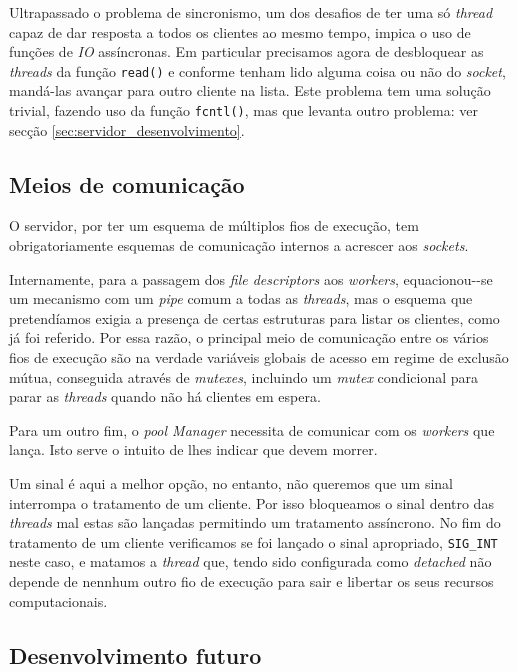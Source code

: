 	Ultrapassado o problema de sincronismo, um dos desafios de ter uma só \emph{thread} capaz de dar resposta a todos os clientes ao mesmo tempo, impica o uso de funções de \emph{IO} assíncronas.
	Em particular precisamos agora de desbloquear as \emph{threads} da função \verb|read()| e conforme tenham lido alguma coisa ou não do \emph{\emph{socket}}, mandá-las avançar para outro cliente na lista.
	Este problema tem uma solução trivial, fazendo uso da função \verb|fcntl()|, mas que levanta outro problema: ver secção \ref{sec:servidor_desenvolvimento}.
	


\clearpage
\subsection{Meios de comunicação\label{sec:servidor_comunicacao}}

	\indent\indent O servidor, por ter um esquema de múltiplos fios de execução, tem obrigatoriamente esquemas de comunicação internos a acrescer aos \emph{sockets}.
	
	Internamente, para a passagem dos \emph{file descriptors} aos \emph{workers}, {equacionou-}{-se} um mecanismo com um \emph{pipe} comum a todas as \emph{threads}, mas o esquema que pretendíamos exigia a presença de certas estruturas para listar os clientes, como já foi referido.
	Por essa razão, o principal meio de comunicação entre os vários fios de execução são na verdade variáveis globais de acesso em regime de exclusão mútua, conseguida através de \emph{mutexes}, incluindo um \emph{mutex} condicional para parar as \emph{threads} quando não há clientes em espera.
	
	Para um outro fim, o \emph{pool Manager} necessita de comunicar com os \emph{workers} que lança.
	Isto serve o intuito de lhes indicar que devem morrer.
	
	Um sinal é aqui a melhor opção, no entanto, não queremos que um sinal interrompa o tratamento de um cliente.
	Por isso bloqueamos o sinal dentro das \emph{threads} mal estas são lançadas permitindo um tratamento assíncrono.
	No fim do tratamento de um cliente verificamos se foi lançado o sinal apropriado, \verb|SIG_INT| neste caso, e matamos a \emph{thread} que, tendo sido configurada como \emph{detached} não depende de nennhum outro fio de execução para sair e libertar os seus recursos computacionais.

\clearpage
\subsection{Desenvolvimento futuro\label{sec:servidor_desenvolvimento}}

